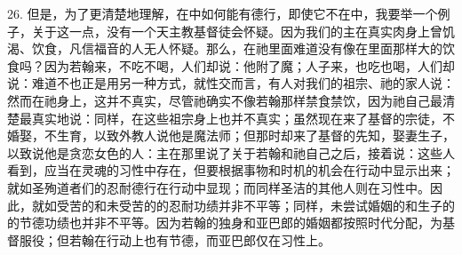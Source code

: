 26. 但是，为了更清楚地理解，在中如何能有德行，即使它不在中，我要举一个例子，关于这一点，没有一个天主教基督徒会怀疑。因为我们的主在真实肉身上曾饥渴、饮食，凡信福音的人无人怀疑。那么，在祂里面难道没有像在里面那样大的饮食吗？因为若翰来，不吃不喝，人们却说：他附了魔；人子来，也吃也喝，人们却说：难道不也正是用另一种方式，就性交而言，有人对我们的祖宗、祂的家人说：然而在祂身上，这并不真实，尽管祂确实不像若翰那样禁食禁饮，因为祂自己最清楚最真实地说：同样，在这些祖宗身上也并不真实；虽然现在来了基督的宗徒，不婚娶，不生育，以致外教人说他是魔法师；但那时却来了基督的先知，娶妻生子，以致说他是贪恋女色的人：主在那里说了关于若翰和祂自己之后，接着说：这些人看到，应当在灵魂的习性中存在，但要根据事物和时机的机会在行动中显示出来；就如圣殉道者们的忍耐德行在行动中显现；而同样圣洁的其他人则在习性中。因此，就如受苦的和未受苦的的忍耐功绩并非不平等；同样，未尝试婚姻的和生子的的节德功绩也并非不平等。因为若翰的独身和亚巴郎的婚姻都按照时代分配，为基督服役；但若翰在行动上也有节德，而亚巴郎仅在习性上。\par

